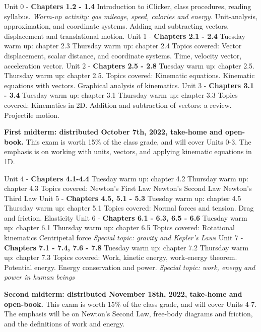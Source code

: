 \documentclass[10pt]{article}
\begin{document}
\begin{outline}[enumerate]
\1 Unit 0 - \textbf{Chapters 1.2 - 1.4}
\2 Introduction to iClicker, class procedures, reading syllabus.
\2 \textit{Warm-up activity: gas mileage, speed, calories and energy.}
\2 Unit-analysis, approximation, and coordinate systems.
\2 Adding and subtracting vectors, displacement and translational motion.
\1 Unit 1 - \textbf{Chapters 2.1 - 2.4}
\2 Tuesday warm up: chapter 2.3
\2 Thursday warm up: chapter 2.4
\2 Topics covered:
\3 Vector displacement, scalar distance, and coordinate systems.
\3 Time, velocity vector, acceleration vector.
\1 Unit 2 - \textbf{Chapters 2.5 - 2.8}
\2 Tuesday warm up: chapter 2.5.
\2 Thursday warm up: chapter 2.5.
\2 Topics covered:
\3 Kinematic equations.
\3 Kinematic equations with vectors.
\3 Graphical analysis of kinematics.
\1 Unit 3 - \textbf{Chapters 3.1 - 3.4}
\2 Tuesday warm up: chapter 3.1
\2 Thursday warm up: chapter 3.3
\2 Topics covered:
\3 Kinematics in 2D.
\3 Addition and subtraction of vectors: a review.
\3 Projectile motion.

\1 \textbf{First midterm: distributed October 7th, 2022, take-home and open-book.}  This exam is worth 15\% of the class grade, and will cover Units 0-3. The emphasis is on working with units, vectors, and applying kinematic equations in 1D.

\1 Unit 4 - \textbf{Chapters 4.1-4.4}
\2 Tuesday warm up: chapter 4.2
\2 Thursday warm up: chapter 4.3
\2 Topics covered:
\3 Newton's First Law
\3 Newton's Second Law
\3 Newton's Third Law
\1 Unit 5 - \textbf{Chapters 4.5, 5.1 - 5.3}
\2 Tuesday warm up: chapter 4.5
\2 Thursday warm up: chapter 5.1
\2 Topics covered:
\3 Normal forces and tension.
\3 Drag and friction.
\3 Elasticity
\1 Unit 6 - \textbf{Chapters 6.1 - 6.3, 6.5 - 6.6}
\2 Tuesday warm up: chapter 6.1
\2 Thursday warm up: chapter 6.5
\2 Topics covered:
\3 Rotational kinematics
\3 Centripetal force
\3 \textit{Special topic: gravity and Kepler's Laws}
\1 Unit 7 - \textbf{Chapters 7.1 - 7.4, 7.6 - 7.8}
\2 Tuesday warm up: chapter 7.2
\2 Thursday warm up: chapter 7.3
\2 Topics covered:
\3 Work, kinetic energy, work-energy theorem.
\3 Potential energy.
\3 Energy conservation and power.
\3 \textit{Special topic: work, energy and power in human beings}

\1 \textbf{Second midterm: distributed November 18th, 2022, take-home and open-book.} This exam is worth 15\% of the class grade, and will cover Units 4-7. The emphasis will be on Newton's Second Law, free-body diagrams and friction, and the definitions of work and energy.


\end{outline}
\end{document}
